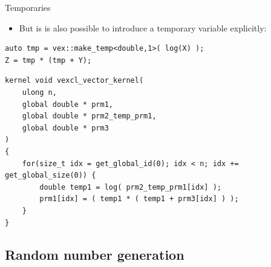\documentclass[@BEAMER_OPTIONS@]{beamer}
\begin{document}
\begin{frame}[fragile]{Temporaries}
    \begin{itemize}
        \item But is is also possible to introduce a temporary variable
            explicitly:
    \end{itemize}
    \begin{exampleblock}{}
        \begin{lstlisting}
auto tmp = vex::make_temp<double,1>( log(X) );
Z = tmp * (tmp + Y);
        \end{lstlisting}
    \end{exampleblock}
    \begin{exampleblock}{}
        \begin{lstlisting}
kernel void vexcl_vector_kernel(
    ulong n,
    global double * prm1,
    global double * prm2_temp_prm1,
    global double * prm3
)
{
    for(size_t idx = get_global_id(0); idx < n; idx += get_global_size(0)) {
        double temp1 = log( prm2_temp_prm1[idx] );
        prm1[idx] = ( temp1 * ( temp1 + prm3[idx] ) );
    }
}
        \end{lstlisting}
    \end{exampleblock}
\end{frame}

\subsection{Random number generation}
\end{document}
